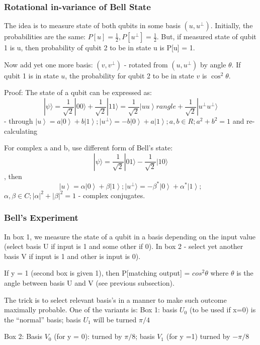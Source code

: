 \documentclass{scrartcl}
\newcommand{\ket}[1]{\left| #1 \right>} %
\begin{document}
\subsubsection{Rotational in-variance of Bell State}
\label{sec:4-2-1}

The idea is to measure state of both qubits in some basis $(u, u^{\perp})$.
Initially, the probabilities are the same: $P[u] = \frac1{2}, P[u^{\perp}] =
\frac1{2}$. But, if measured state of qubit 1 is u, then probability of qubit 2
to be in state u is P[u] = 1.

Now add yet one more basis: $(v, v^{\perp})$ - rotated from $(u, u^{\perp})$ by
angle $\theta$. If qubit 1 is in state $u$, the probability for qubit 2 to be in
state $v$ is $\cos^2 \theta$.

Proof: The state of a qubit can be expressed as: $$|\psi\rangle =
\frac1{\sqrt{2}} |00\rangle + \frac1{\sqrt{2}}|11\rangle = \frac1{\sqrt{2}}
\ket{uu} rangle + \frac1{\sqrt{2}}|u^{\perp}u^{\perp}\rangle$$ - through $\ket u = a
\ket0 + b \ket1;|u^{\perp}\rangle = -b \ket0 + a \ket1; a, b \in R; a^2 + b^2 =
1$ and re-calculating

For complex a and b, use different form of Bell's state: $$ |\psi\rangle =
\frac1{\sqrt{2}} | 01 \rangle - \frac1{\sqrt{2}} | 10 \rangle $$, then $$\ket u
= \alpha \ket0 + \beta \ket1; |u^{\perp}\rangle = -\beta^* \ket0 + \alpha^*
\ket1;$$ $ \alpha, \beta \in C; |\alpha|^2 + |\beta|^2 = 1$ - complex
conjugates.

\subsubsection{Bell's Experiment}
\label{sec:4-3}

In box 1, we measure the state of a qubit in a basis depending on the input
value (select basis U if input is 1 and some other if 0). In box 2 - select yet
another basis V if input is 1 and other is input is 0).

If y = 1 (second box is given 1), then P[matching output] = $cos^2 \theta$ where
$\theta$ is the angle between basis U and V (see previous subsection).

The trick is to select relevant basis's in a manner to make such outcome
maximally probable. One of the variants is: Box 1: basis $U_0$ (to be used if
x=0) is the ``normal'' basis; basis $U_1$ will be turned $\pi / 4$

Box 2: Basis $V_0$ (for y = 0): turned by $\pi /8$; basis $V_1$ (for y =1)
turned by $ - \pi / 8$
\end{document}
